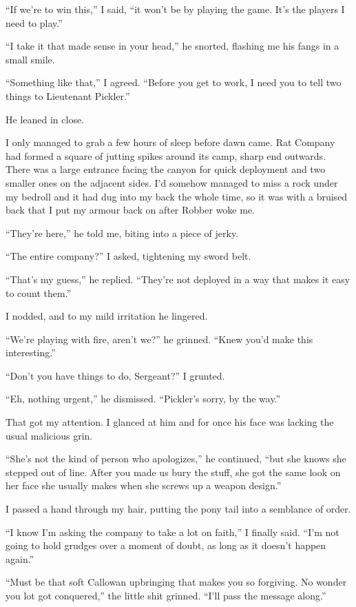 \documentclass[12pt, openany]{book}
\begin{document}
“If we’re to win this,” I said, “it won’t be by playing the game. It’s the players I need to play.”

“I take it that made sense in your head,” he snorted, flashing me his fangs in a small smile.

“Something like that,” I agreed. “Before you get to work, I need you to tell two things to Lieutenant Pickler.”

He leaned in close.

I only managed to grab a few hours of sleep before dawn came. Rat Company had formed a square of jutting spikes around its camp, sharp end outwards. There was a large entrance facing the canyon for quick deployment and two smaller ones on the adjacent sides. I’d somehow managed to miss a rock under my bedroll and it had dug into my back the whole time, so it was with a bruised back that I put my armour back on after Robber woke me.

“They’re here,” he told me, biting into a piece of jerky.

“The entire company?” I asked, tightening my sword belt.

“That’s my guess,” he replied. “They’re not deployed in a way that makes it easy to count them.”

I nodded, and to my mild irritation he lingered.

“We’re playing with fire, aren’t we?” he grinned. “Knew you’d make this interesting.”

“Don’t you have things to do, Sergeant?” I grunted.

“Eh, nothing urgent,” he dismissed. “Pickler’s sorry, by the way.”

That got my attention. I glanced at him and for once his face was lacking the usual malicious grin.

“She’s not the kind of person who apologizes,” he continued, “but she knows she stepped out of line. After you made us bury the stuff, she got the same look on her face she usually makes when she screws up a weapon design.”

I passed a hand through my hair, putting the pony tail into a semblance of order.

“I know I’m asking the company to take a lot on faith,” I finally said. “I’m not going to hold grudges over a moment of doubt, as long as it doesn’t happen again.”

“Must be that soft Callowan upbringing that makes you so forgiving. No wonder you lot got conquered,” the little shit grinned. “I’ll pass the message along.”
\end{document}
